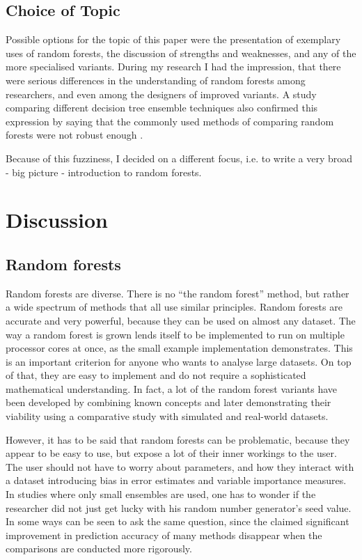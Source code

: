 \documentclass[a4paper,man,12pt,apacite,floatsintext]{apa6} %
\begin{document}
\subsection{Choice of Topic}
Possible options for the topic of this paper were the presentation of
exemplary uses of random
forests, the discussion of strengths and weaknesses, and any of the more
specialised variants.
During my research I had the impression, that there were serious
differences in the understanding of random forests among researchers,
and even among the designers of improved variants.
A study comparing different decision tree ensemble techniques also confirmed
this expression by saying that the commonly used methods of comparing random forests
were not robust enough \cite{banfield2007comparison}.

Because of this fuzziness, I decided on a different focus, i.e. to write
a very broad - big picture - introduction to random forests.

\newpage
\section{Discussion}
\subsection{Random forests}
Random forests are diverse.
There is no “the random forest” method, but rather a wide spectrum of
methods that all use similar principles.
Random forests are accurate and very powerful, because they can be used
on almost any dataset.
The way a random forest is grown lends itself to be implemented to run on multiple processor 
cores at once, as the
small example implementation demonstrates.
This is an important criterion
for anyone who wants to analyse large datasets.
On top of that, they are easy to implement and do not require a sophisticated
mathematical understanding.
In fact, a lot of the random forest variants have been developed by combining
known concepts and later demonstrating their viability using a comparative
study with simulated and real-world datasets.

However, it has to be said that random forests can be problematic,
because they appear to be easy to use, but expose a lot of their
inner workings to the user.
The user should not have to worry about parameters, and how they interact
with a dataset introducing bias in error estimates and
variable importance measures.
In studies where only small ensembles are used, one has to wonder if the
researcher did not just get lucky with his random number generator's seed value.
In some ways  can be seen to ask the same question,
since the claimed significant improvement in prediction accuracy of many methods
disappear when the comparisons are conducted more rigorously.
\end{document}
